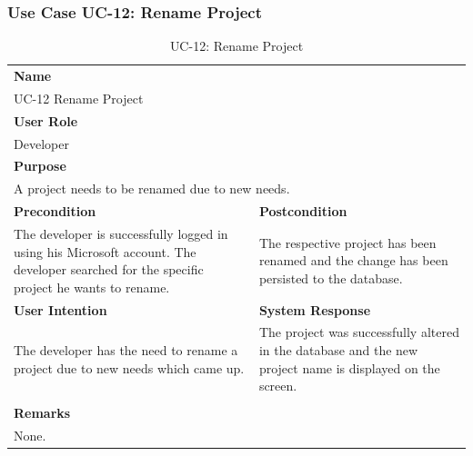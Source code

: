 
\subsubsection{Use Case UC-12: Rename Project}\label{subsubsec:use-case-uc-12:-rename-project}

\begin{table}[H]
    \centering
    \begin{tabular}{|p{}|p{}|}

        \hline
        \multicolumn{2}{|l|}{\rowcolor{gray!50}\textbf{Name}} \\
        \multicolumn{2}{|l|}{UC-12 Rename Project} \\ \hline

        \multicolumn{2}{|l|}{\rowcolor{gray!50}\textbf{User Role}} \\
        \multicolumn{2}{|l|}{Developer} \\ \hline

        \multicolumn{2}{|l|}{\rowcolor{gray!50}\textbf{Purpose}} \\
        \multicolumn{2}{|p{1\textwidth}|}{A project needs to be renamed due to new needs.} \\ \hline

        \rowcolor{gray!50}\textbf{Precondition} & \rowcolor{gray!50}\textbf{Postcondition} \\
        The developer is successfully logged in using his Microsoft account.
        The developer searched for the specific project he wants to rename.
        &
        The respective project has been renamed and the change has been persisted to the database.\\ \hline

        \rowcolor{gray!50}\textbf{User Intention} & \rowcolor{gray!50}\textbf{System Response} \\
        The developer has the need to rename a project due to new needs which came up.
        &
        The project was successfully altered in the database and the new project name is displayed on the screen. \\ \hline

        & \\ \hline

        \multicolumn{2}{|l|}{\rowcolor{gray!50}\textbf{Remarks}} \\
        \multicolumn{2}{|p{1\textwidth}|}{None.} \\ \hline
    \end{tabular}
    \caption{UC-12: Rename Project}
    \label{tab:uc-rename-project}
\end{table}

